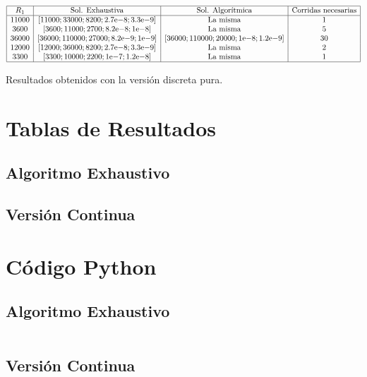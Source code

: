 \documentclass{llncs}
\newcommand{\expnumber}[2]{{#1}\mathrm{e}{#2}}
\begin{document}
	\begin{table}[!h]
		$$
		\begin{array}{|c|c|c|c|}
		\hline
		R_1 & \text{Sol. Exhaustiva} & \text{Sol. Algorítmica} & \text{Corridas necesarias} \\
		\hline
		11000 & [11000; 33000; 8200; \expnumber{2.7}{-8}; \expnumber{3.3}{-9}] & \text{La misma} & 1 \\
		3600 & [3600; 11000; 2700; \expnumber{8.2}{-8}; \expnumber{1}{-8}] & \text{La misma} & 5 \\
		36000 & [36000; 110000; 27000; \expnumber{8.2}{-9}; \expnumber{1}{-9}] & [36000; 110000; 20000; \expnumber{1}{-8}; \expnumber{1.2}{-9}] & 30  \\
		12000 & [12000; 36000; 8200; \expnumber{2.7}{-8};\expnumber{3.3}{-9}] & \text{La misma} & 2  \\
		3300 & [3300; 10000; 2200; \expnumber{1}{-7}; \expnumber{1.2}{-8}] & \text{La misma} & 1  \\
		\hline
		\end{array}
		$$
		\caption{Resultados obtenidos con la versión discreta pura.}
		\label{cuadroSolDiscretoPuro}
	\end{table}
		

	\appendix
	\section{\textbf{Tablas de Resultados}}
	\subsection{Algoritmo Exhaustivo}
	\label{subsec:Resultados Exhaustivo}
	\subsection{Versión Continua}
	\label{subsec:Resultados Continuos}
	
	\section{\textbf{Código Python}}
	\subsection{Algoritmo Exhaustivo}
	\label{subsec:pythonexhaustivo}
	\inputminted{python}{exhaustivo.py}
	\subsection{Versión Continua}
	\label{subsec:pythoncontinuo}
	\inputminted{python}{filtro_continuoLibre.py}
\end{document}
